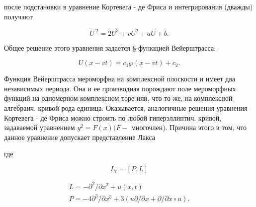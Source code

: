 \documentclass[10pt]{article}
\begin{document}
после подстановки в уравнение Кортевега - де Фриса и интегрирования (дважды) получают



\[

U^{\prime 2}=2 U^{3}+v U^{2}+a U+b .

\]



Общее решение этого уравнения задается §-функщией Вейерштрасса:



\[

U(x-v t)=c_{1} \wp(x-v t)+c_{2} .

\]



Функция Вейерштрасса мероморфна на комплексной плоскости и имеет два независимых периода. Она и ее производная порождают поле мероморфных функций на одномерном комплексном торе или, что то же, на комплексной алгебраич. кривой рода единица. Оказывается, аналогичные решения уравнения Кортевега - де Фриса можно строить по любой гиперэллиптич. кривой, задаваемой уравнением $y^{2}=F(x)(F-$ многочлен). Причина этого в том, что данное уравнение допускает представление Лакса



где



\[

L_{t}=[P, L]

\]



\[

\begin{gathered}

L=-\partial^{2} / \partial x^{2}+u(x, t) \\

P=-4 \partial^{3} / \partial x^{3}+3(u \partial / \partial x+\partial / \partial x \circ u) .

\end{gathered}

\]
\end{document}
